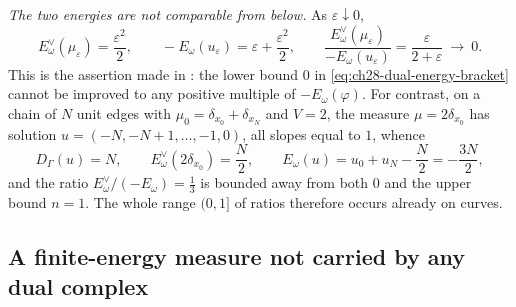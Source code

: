 \begin{example}
\emph{The two energies are not comparable from below.}  As
\(\varepsilon\downarrow0\),
\[
 E^\vee_\omega(\mu_\varepsilon)=\frac{\varepsilon^2}2,
 \qquad
 -E_\omega(u_\varepsilon)=\varepsilon+\frac{\varepsilon^2}2,
 \qquad
 \frac{E^\vee_\omega(\mu_\varepsilon)}{-E_\omega(u_\varepsilon)}
 =\frac{\varepsilon}{2+\varepsilon}\ \longrightarrow\ 0 .
\]
This is the assertion made in : the lower
bound \(0\) in \eqref{eq:ch28-dual-energy-bracket} cannot be improved to any
positive multiple of \(-E_\omega(\varphi)\).  For contrast, on a chain of
\(N\) unit edges with \(\mu_0=\delta_{x_0}+\delta_{x_N}\) and \(V=2\), the
measure \(\mu=2\delta_{x_0}\) has solution
\(u=(-N,-N+1,\ldots,-1,0)\), all slopes equal to \(1\), whence
\[
 D_\Gamma(u)=N,
 \qquad
 E^\vee_\omega(2\delta_{x_0})=\frac N2 ,
 \qquad
 E_\omega(u)=u_0+u_N-\frac N2=-\frac{3N}2 ,
\]
and the ratio \(E^\vee_\omega/(-E_\omega)=\tfrac13\) is bounded away from
both \(0\) and the upper bound \(n=1\).  The whole range \((0,1]\) of ratios
therefore occurs already on curves.
\end{example}

\subsection{A finite-energy measure not carried by any dual complex}
\label{sec:ch28-not-skeletal}

